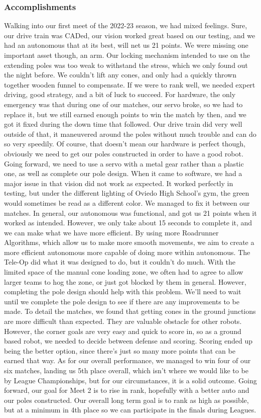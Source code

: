 \subsubsection*{Accomplishments}
Walking into our first meet of the 2022-23 season, we had mixed feelings. Sure, our drive train was CADed, our vision worked great based on our testing, and we had an autonomous that at its best, will net us 21 points. We were missing one important asset though, an arm. Our locking mechanism intended to use on the extending poles was too weak to withstand the stress, which we only found out the night before. We couldn't lift any cones, and only had a quickly thrown together wooden funnel to compensate. If we were to rank well, we needed expert driving, good strategy, and a bit of luck to succeed.
For hardware, the only emergency was that during one of our matches, our servo broke, so we had to replace it, but we still earned enough points to win the match by then, and we got it fixed during the down time that followed. Our drive train did very well outside of that, it maneuvered around the poles without much trouble and can do so very speedily. Of course, that doesn't mean our hardware is perfect though, obviously we need to get our poles constructed in order to have a good robot. Going forward, we need to use a servo with a metal gear rather than a plastic one, as well as complete our pole design.
When it came to software, we had a major issue in that vision did not work as expected. It worked perfectly in testing, but under the different lighting of Oviedo High School's gym, the green would sometimes be read as a different color. We managed to fix it between our matches. In general, our autonomous was functional, and got us 21 points when it worked as intended. However, we only take about 15 seconds to complete it, and we can make what we have more efficient. By using more Roadrunner Algorithms, which allow us to make more smooth movements, we aim to create a more efficient autonomous more capable of doing more within autonomous. The Tele-Op did what it was designed to do, but it couldn't do much. With the limited space of the manual cone loading zone, we often had to agree to allow larger teams to hog the zone, or just got blocked by them in general. However, completing the pole design should help with this problem. We'll need to wait until we complete the pole design to see if there are any improvements to be made.
To detail the matches, we found that getting cones in the ground junctions are more difficult than expected. They are valuable obstacle for other robots. However, the corner goals are very easy and quick to score in, so as a ground based robot, we needed to decide between defense and scoring. Scoring ended up being the better option, since there's just so many more points that can be earned that way.
As for our overall performance, we managed to win four of our six matches, landing us 5th place overall, which isn't where we would like to be by League Championships, but for our circumstances, it is a solid outcome. Going forward, our goal for Meet 2 is to rise in rank, hopefully with a better auto and our poles constructed. Our overall long term goal is to rank as high as possible, but at a minimum in 4th place so we can participate in the finals during Leagues.
 

